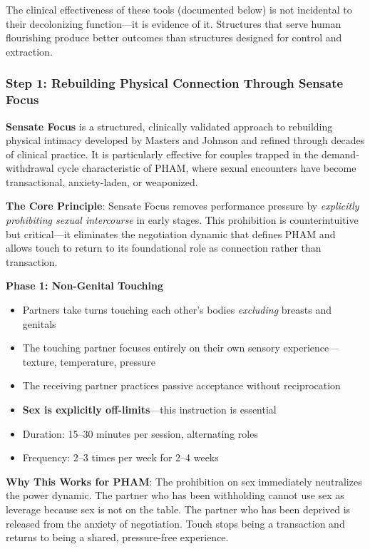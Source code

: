 \documentclass[12pt, letterpaper]{article}
\begin{document}
The clinical effectiveness of these tools (documented below) is not incidental to their decolonizing function---it is evidence of it. Structures that serve human flourishing produce better outcomes than structures designed for control and extraction.

\subsubsection{Step 1: Rebuilding Physical Connection Through Sensate Focus}

\textbf{Sensate Focus} is a structured, clinically validated approach to rebuilding physical intimacy developed by Masters and Johnson and refined through decades of clinical practice. It is particularly effective for couples trapped in the demand-withdrawal cycle characteristic of PHAM, where sexual encounters have become transactional, anxiety-laden, or weaponized.

\textbf{The Core Principle}: Sensate Focus removes performance pressure by \textit{explicitly prohibiting sexual intercourse} in early stages. This prohibition is counterintuitive but critical---it eliminates the negotiation dynamic that defines PHAM and allows touch to return to its foundational role as connection rather than transaction.

\textbf{Phase 1: Non-Genital Touching}
\begin{itemize}
    \item Partners take turns touching each other's bodies \textit{excluding} breasts and genitals
    \item The touching partner focuses entirely on their own sensory experience---texture, temperature, pressure
    \item The receiving partner practices passive acceptance without reciprocation
    \item \textbf{Sex is explicitly off-limits}---this instruction is essential
    \item Duration: 15--30 minutes per session, alternating roles
    \item Frequency: 2--3 times per week for 2--4 weeks
\end{itemize}

\textbf{Why This Works for PHAM}: The prohibition on sex immediately neutralizes the power dynamic. The partner who has been withholding cannot use sex as leverage because sex is not on the table. The partner who has been deprived is released from the anxiety of negotiation. Touch stops being a transaction and returns to being a shared, pressure-free experience.
\end{document}
